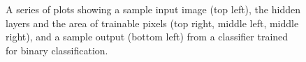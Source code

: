 \documentclass[]{article}
\begin{document}
\begin{figure}[h]
	\centering
	\caption{A series of plots showing a sample input image (top left), the hidden layers and the area of trainable pixels (top right, middle left, middle right), and a sample output (bottom left) from a classifier trained for binary classification.}
\end{figure}
\end{document}
